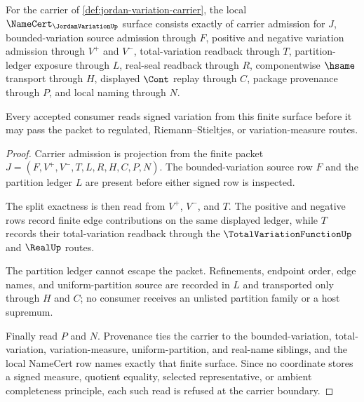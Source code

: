 \begin{theorem}
\label{thm:jordan-variation-namecert-obligations}
For the carrier of \autoref{def:jordan-variation-carrier}, the local $\NameCert_{\JordanVariationUp}$ surface consists exactly of carrier admission for $J$, bounded-variation source admission through $F$, positive and negative variation admission through $V^{+}$ and $V^{-}$, total-variation readback through $T$, partition-ledger exposure through $L$, real-seal readback through $R$, componentwise $\hsame$ transport through $H$, displayed $\Cont$ replay through $C$, package provenance through $P$, and local naming through $N$.

Every accepted consumer reads signed variation from this finite surface before it may pass the packet to regulated, Riemann--Stieltjes, or variation-measure routes.
\end{theorem}
\begin{proof}
Carrier admission is projection from the finite packet $J=(F,V^{+},V^{-},T,L,R,H,C,P,N)$. The bounded-variation source row $F$ and the partition ledger $L$ are present before either signed row is inspected.

The split exactness is then read from $V^{+}$, $V^{-}$, and $T$. The positive and negative rows record finite edge contributions on the same displayed ledger, while $T$ records their total-variation readback through the $\TotalVariationFunctionUp$ and $\RealUp$ routes.

The partition ledger cannot escape the packet. Refinements, endpoint order, edge names, and uniform-partition source are recorded in $L$ and transported only through $H$ and $C$; no consumer receives an unlisted partition family or a host supremum.

Finally read $P$ and $N$. Provenance ties the carrier to the bounded-variation, total-variation, variation-measure, uniform-partition, and real-name siblings, and the local NameCert row names exactly that finite surface. Since no coordinate stores a signed measure, quotient equality, selected representative, or ambient completeness principle, each such read is refused at the carrier boundary.
\end{proof}



